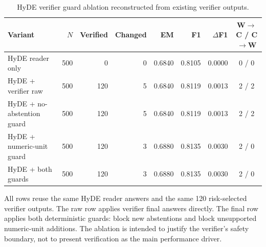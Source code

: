 \begin{table}[t]
\centering
\caption{HyDE verifier guard ablation reconstructed from existing verifier outputs.}
\label{tab:hyde_verifier_guard_ablation}
\small
\begin{threeparttable}
\begin{tabularx}{\textwidth}{>{\raggedright\arraybackslash}X r r r r r r c}
\toprule
Variant & $N$ & Verified & Changed & EM & F1 & $\Delta$F1 & W$\rightarrow$C / C$\rightarrow$W \\
\midrule
HyDE reader only & 500 & 0 & 0 & 0.6840 & 0.8105 & 0.0000 & 0 / 0 \\
HyDE + verifier raw & 500 & 120 & 5 & 0.6840 & 0.8119 & 0.0013 & 2 / 2 \\
HyDE + no-abstention guard & 500 & 120 & 5 & 0.6840 & 0.8119 & 0.0013 & 2 / 2 \\
HyDE + numeric-unit guard & 500 & 120 & 3 & 0.6880 & 0.8135 & 0.0030 & 2 / 0 \\
HyDE + both guards & 500 & 120 & 3 & 0.6880 & 0.8135 & 0.0030 & 2 / 0 \\
\bottomrule
\end{tabularx}
\begin{tablenotes}
\footnotesize
\item All rows reuse the same HyDE reader answers and the same 120 risk-selected verifier outputs. The raw row applies verifier final answers directly. The final row applies both deterministic guards: block new abstentions and block unsupported numeric-unit additions. The ablation is intended to justify the verifier's safety boundary, not to present verification as the main performance driver.
\end{tablenotes}
\end{threeparttable}
\end{table}
